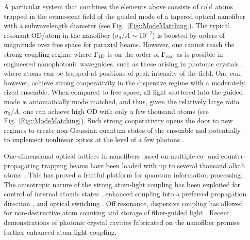 \documentclass[preprint, aps,pra,onecolumn]{revtex4-1} %
\newcommand{\frf}[1]{Fig.~\ref{#1}}
\newcommand{\oneD}{{\rm 1D}}
\newcommand{\vac}{{\rm vac}}
\begin{document}
A particular system that combines the elements above consists of cold atoms trapped in the evanescent field of the guided mode of a tapered optical nanofiber with a subwavelength diameter \cite{vetsch_optical_2010, lacroute_state-insensitive_2012, balykin_quantum_2014, grover_photon-correlation_2015, Lee2015Inhomogeneous} (see \frf{Fig::ModeMatching}).  
The typical resonant OD/atom in the nanofiber ($\sigma_0/A \sim  10^{-2}$) is boosted by orders of magnitude over free space for paraxial beams. 
However, one cannot reach the strong coupling regime where $\Gamma_{\oneD}$ is on the order of $\Gamma_{\vac}$ as is possible in engineered nanophotonic waveguides, such as those arising in photonic crystals \cite{hung_trapped_2013}, where atoms can be trapped at positions of peak intensity of the field.  
One can, however, achieve strong cooperativity in the dispersive regime with a moderately sized ensemble.  When compared to free space, all light scattered into the guided mode is automatically mode matched, and thus, given the relatively large ratio $\sigma_0/A$, one can achieve high OD with only a few thousand atoms (see \frf{Fig::ModeMatching}).  
Such strong cooperativity opens the door to new regimes to create non-Gaussian quantum states of the ensemble \cite{dubost_efficient_2012} and potentially to implement nonlinear optics at the level of a few photons \cite{spillane_observation_2008, pittman_ultralow-power_2013, oshea_fiber-optical_2013}.


One-dimensional optical lattices in nanofibers based on multiple co- and counter-propagating trapping beams have been loaded with up to several thousand alkali atoms \cite{vetsch_optical_2010, lacroute_state-insensitive_2012}.
This has proved a fruitful platform for quantum information processing.  
The anisotropic nature of the strong atom-light coupling has been exploited for control of internal atomic states \cite{mitsch_exploiting_2014}, enhanced coupling into a preferred propagation direction \cite{petersen_chiral_2014, mitsch_quantum_2014}, and optical switching \cite{oshea_fiber-optical_2013}. 
Off resonance, dispersive coupling has allowed for non-destructive atom counting \cite{dawkins_dispersive_2011, beguin_generation_2014} 
and storage of fiber-guided light \cite{gouraud_demonstration_2015, sayrin_storage_2015}.
Recent demonstrations of photonic crystal cavities fabricated on the nanofiber \cite{wuttke_nanofiber_2012, nayak_optical_2014, schell_highly_2015} promise further enhanced atom-light coupling.
\end{document}
